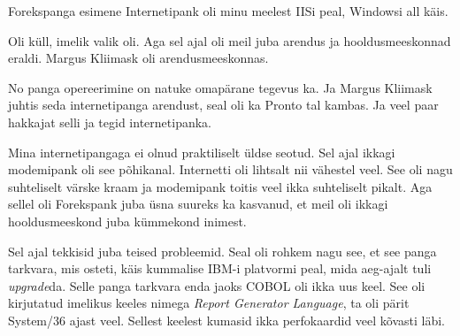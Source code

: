 
Forekspanga esimene Internetipank oli minu meelest 
IISi peal, 
Windowsi all käis. 


Oli küll, imelik valik oli. Aga sel ajal oli meil juba arendus ja 
hooldusmeeskonnad eraldi. Margus Kliimask oli 
arendusmeeskonnas. 


No panga opereerimine on natuke omapärane tegevus ka. Ja Margus 
Kliimask juhtis seda internetipanga arendust, seal 
oli ka Pronto  tal kambas. Ja  veel paar 
hakkajat selli ja tegid internetipanka. 


Mina internetipangaga ei olnud praktiliselt üldse seotud. Sel ajal ikkagi 
modemipank oli see põhikanal. Internetti oli lihtsalt nii vähestel veel. See 
oli nagu suhteliselt värske kraam ja modemipank toitis veel ikka suhteliselt 
pikalt. Aga sellel oli Forekspank juba üsna suureks ka kasvanud, et meil oli 
ikkagi hooldusmeeskond juba kümmekond inimest.


Sel ajal tekkisid juba teised probleemid. Seal oli rohkem nagu see, et see 
panga tarkvara, mis osteti, käis kummalise IBM-i platvormi peal, mida aeg-ajalt 
tuli \emph{upgrade}da. Selle panga tarkvara enda jaoks COBOL oli ikka uus keel. 
See oli kirjutatud imelikus keeles nimega \emph{Report Generator Language}, ta 
oli pärit System/36 ajast veel. Sellest keelest 
kumasid ikka perfokaardid veel kõvasti läbi.



